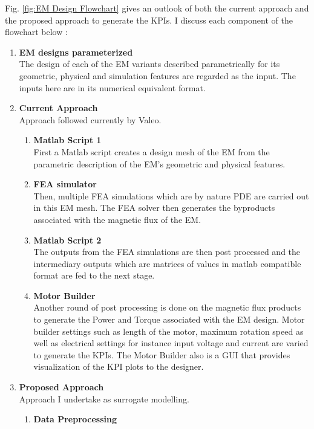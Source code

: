 \documentclass{report} %
\begin{document}
Fig. \ref{fig:EM Design Flowchart} gives an outlook of both the current approach and the proposed approach to generate the \ac{KPI}s.
I discuss each component of the flowchart below :
\begin{enumerate}
    \item \textbf{\ac{EM} designs parameterized} \\
    The design of each of the \ac{EM} variants described parametrically for its geometric, physical and simulation features are regarded as the input.
    The inputs here are in its numerical equivalent format.
    \item \textbf{Current Approach}\\
    Approach followed currently by Valeo.
    \begin{enumerate}
        \item \textbf{Matlab Script 1} \\
        First a Matlab script creates a design mesh of the \ac{EM} from the parametric description of the \ac{EM}'s geometric and physical features.
        \item \textbf{\ac{FEA} simulator} \\
        Then, multiple \ac{FEA} simulations which are by nature \ac{PDE} are carried out in this \ac{EM} mesh. The \ac{FEA} solver then 
        generates the byproducts associated with the magnetic flux of the \ac{EM}.
        \item \textbf{Matlab Script 2} \\
        The outputs from the \ac{FEA} simulations are then post processed and the intermediary outputs which are matrices of values in matlab compatible format are 
        fed to the next stage.
        \item \textbf{Motor Builder} \\
        Another round of post processing is done on the magnetic flux products to generate the Power and Torque associated with the \ac{EM} design.
        Motor builder settings such as length of the motor, maximum rotation speed as well as electrical settings for instance input voltage and current are varied to 
        generate the \ac{KPI}s. The Motor Builder also is a GUI that provides visualization of the \ac{KPI} plots to the designer.
    \end{enumerate}
    \item \textbf{Proposed Approach}\\
    Approach I undertake as surrogate modelling.
    \begin{enumerate}
        \item \textbf{Data Preprocessing} \\

\end{enumerate}
\end{enumerate}
\end{document}
